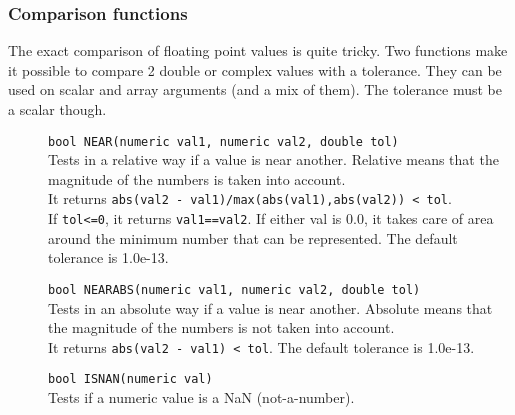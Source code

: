 \subsubsection{Comparison functions}
The exact comparison of floating point values is quite tricky.
Two functions make it possible to compare 2 double or complex
values with a tolerance.
They can be used on scalar and array arguments (and a mix of them).
The tolerance must be a scalar though.
\begin{description}
  \item[] \texttt{bool NEAR(numeric val1, numeric val2, double tol)}\\
    Tests in a relative way if a value is near another. Relative
    means that the
    magnitude of the numbers is taken into account.
    \\It returns
    \texttt{abs(val2 - val1)/max(abs(val1),abs(val2)) < tol}.
    \\If \texttt{tol<=0}, it returns \texttt{val1==val2}.
    If either val is 0.0, it takes
    care of area around the minimum number that can be represented.
    The default tolerance is 1.0e-13.
  \item[] \texttt{bool NEARABS(numeric val1, numeric val2, double tol)}\\
    Tests in an absolute way if a value is near another. Absolute
    means that the
    magnitude of the numbers is not taken into account.
    \\It returns \texttt{abs(val2 - val1) < tol}.
    The default tolerance is 1.0e-13.
  \item[] \texttt{bool ISNAN(numeric val)}\\
    Tests if a numeric value is a NaN (not-a-number).
\end{description}

